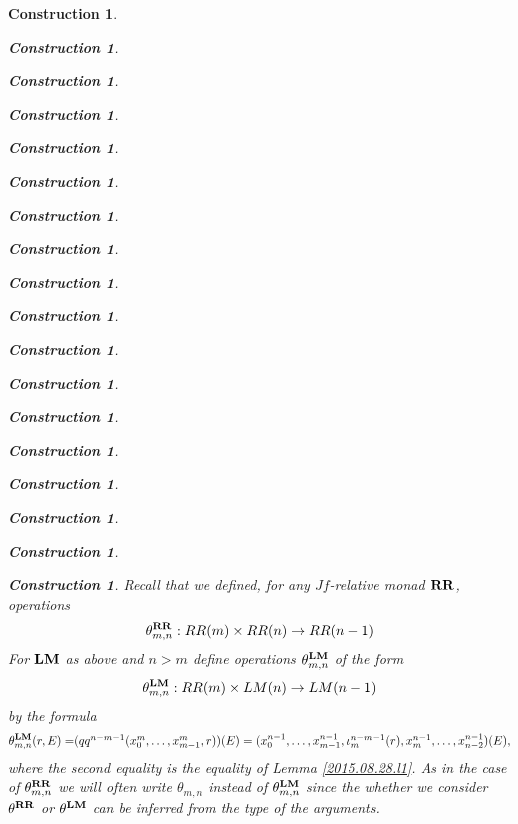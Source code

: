 \documentclass[12pt]{amsart}
\newenvironment{eq}{\begin{equation}}{\end{equation}}
\newtheorem{construction}[proposition]{Construction}
\newcommand{\llabel}[1]{\label{#1}}
\newcommand{\sr}{\rightarrow}
\newcommand{\RR}{{\bf RR}}
\newcommand{\LM}{{\bf LM}}
\begin{document}
\begin{construction}
\begin{construction}
\begin{construction}
\begin{construction}
\begin{construction}
\begin{construction}
\begin{construction}
\begin{construction}
\begin{construction}
\begin{construction}
\begin{construction}
\begin{construction}
\begin{construction}
\begin{construction}
\begin{construction}
\begin{construction}
\begin{construction}
\begin{construction}
Recall that we defined, for any $Jf$-relative monad $\RR$, operations 
%
$$\theta^{\RR}_{m,n}:RR(m)\times RR(n)\sr RR(n-1)$$
% 
For $\LM$ as above and $n>m$ define operations $\theta^{\LM}_{m,n}$ of the form
%
$$\theta^{\LM}_{m,n}:RR(m)\times LM(n)\sr LM(n-1)$$
%
by the formula
%
\begin{eq}\llabel{2015.09.07.eq2}
\theta^{\LM}_{m,n}(r,E)=$$$$(qq^{n-m-1}(x_0^m,\dots,x_{m-1}^m,r))(E)=(x_0^{n-1},\dots,x_{m-1}^{n-1},\iota_m^{n-m-1}(r),x_m^{n-1},\dots, x_{n-2}^{n-1})(E),
\end{eq}%
%
where the second equality is the equality of Lemma \ref{2015.08.28.l1}. As in
the case of $\theta^{\RR}_{m,n}$ we will often write $\theta_{m,n}$ instead of
$\theta^{\LM}_{m,n}$ since the whether we consider $\theta^{\RR}$ or
$\theta^{\LM}$ can be inferred from the type of the arguments.


\end{construction}
\end{construction}
\end{construction}
\end{construction}
\end{construction}
\end{construction}
\end{construction}
\end{construction}
\end{construction}
\end{construction}
\end{construction}
\end{construction}
\end{construction}
\end{construction}
\end{construction}
\end{construction}
\end{construction}
\end{construction}
\end{document}
